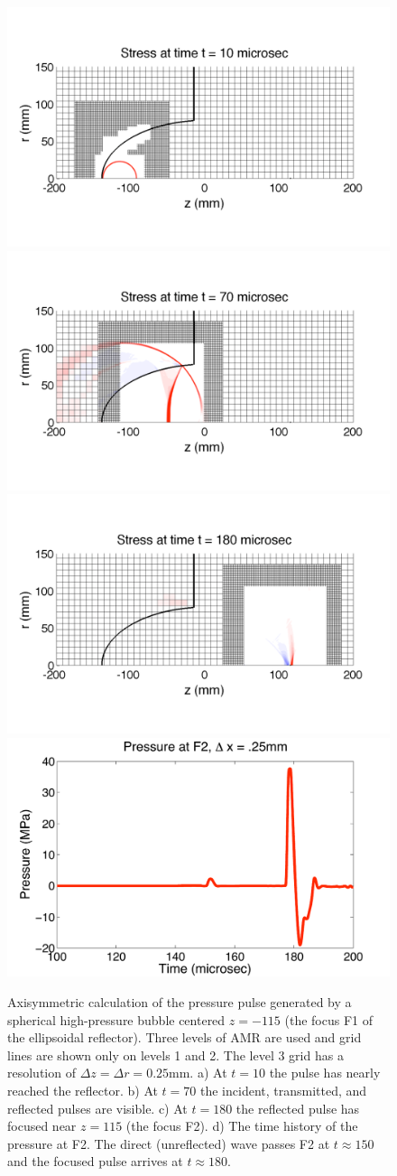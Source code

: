 \documentclass{article}
\begin{document}
\begin{figure}[h!]
\begin{center}
\includegraphics[width=.45\textwidth]{amr_stress10_rwb.pdf}
\includegraphics[width=.45\textwidth]{amr_stress70_rwb.pdf}\vspace{1mm}
\includegraphics[width=.45\textwidth]{amr_stress180_rwb.pdf}
\includegraphics[width=.45\textwidth]{amr_25_pressure.pdf}
\caption{
\label{fig:amr_interface}
Axisymmetric calculation of the pressure pulse generated by a spherical high-pressure bubble
centered $z=-115$ (the focus F1 of the ellipsoidal reflector). Three levels of AMR are used and
grid lines are shown only on levels 1 and 2. The level 3 grid has a resolution of $\Delta z =
\Delta r = 0.25$mm. a) At $t=10$ the pulse has nearly reached the reflector. b) At $t=70$ the
incident, transmitted, and reflected pulses are visible. c) At $t=180$ the reflected pulse has
focused near $z=115$ (the focus F2). d) The time history of the pressure at F2. The direct
(unreflected) wave passes F2 at $t\approx 150$ and the focused pulse arrives at $t\approx 180$.}
\end{center}
\end{figure}
\clearpage
\end{document}
